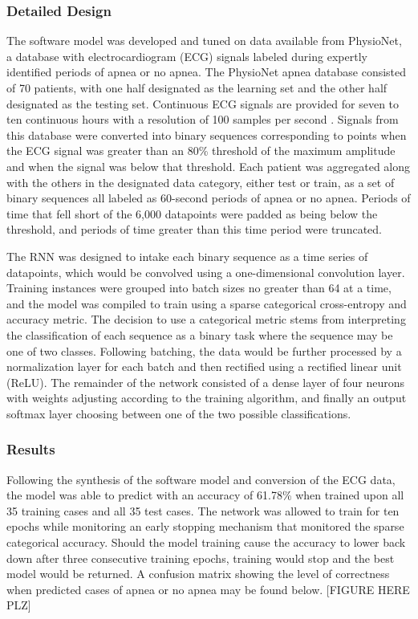 \documentclass[12pt,titlepage]{article}
\begin{document}
\subsubsection{Detailed Design}
The software model was developed and tuned on data available from PhysioNet, a database with electrocardiogram (ECG) signals labeled during expertly 
identified periods of apnea or no apnea. The PhysioNet apnea database consisted of 70 patients, with one half designated as the learning
set and the other half designated as the testing set. Continuous ECG signals are provided for seven to ten continuous hours with a resolution of 100 samples 
per second \cite{physiobank}. Signals from this database were converted into binary sequences corresponding to points when the ECG signal was greater than
an 80\% threshold of the maximum amplitude and when the signal was below that threshold. Each patient was aggregated along with the others in the designated
data category, either test or train, as a set of binary sequences all labeled as 60-second periods of apnea or no apnea. Periods of time that fell short of the
6,000 datapoints were padded as being below the threshold, and periods of time greater than this time period were truncated.

The RNN was designed to intake each binary sequence as a time series of datapoints, which would be convolved using a one-dimensional convolution layer. Training
instances were grouped into batch sizes no greater than 64 at a time, and the model was compiled to train using a sparse categorical cross-entropy and accuracy 
metric. The decision to use a categorical metric stems from interpreting the classification of each sequence as a binary task where the sequence may be one of two 
classes. Following batching, the data would be further processed by a normalization layer for each batch and then rectified using a rectified linear unit (ReLU). 
The remainder of the network consisted of a dense layer of four neurons with weights adjusting according to the training algorithm, and finally an output softmax
layer choosing between one of the two possible classifications. 

\subsubsection{Results}
Following the synthesis of the software model and conversion of the ECG data, the model was able to predict with an accuracy of 61.78\% when trained upon all 35 
training cases and all 35 test cases. The network was allowed to train for ten epochs while monitoring an early stopping mechanism that monitored the sparse
categorical accuracy. Should the model training cause the accuracy to lower back down after three consecutive training epochs, training would stop and the best
model would be returned. A confusion matrix showing the level of correctness when predicted cases of apnea or no apnea may be found below. [FIGURE HERE PLZ]
\end{document}
